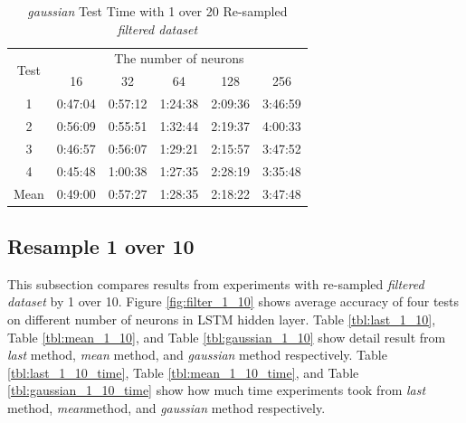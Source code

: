\documentclass[draft,dvipsnames]{drexel-thesis}
\begin{document}
\begin{thesis}
\begin{table}[!t]
\centering
\caption{{\em gaussian} Test Time with 1 over 20 Re-sampled {\em filtered dataset}}
\label{tbl:gaussian_1_20_time}
\begin{tabular}{|c|c|c|c|c|c|}
\hline
\multirow{2}{*}{Test}      & \multicolumn{5}{c|}{The number of neurons}                                                                                                               \\ \cline{2-6}
                           & 16                           & 32                           & 64                           & 128                          & 256                          \\ \hline
1                          & 0:47:04                      & 0:57:12                      & 1:24:38                      & 2:09:36                      & 3:46:59                      \\ \hline
2                          & 0:56:09                      & 0:55:51                      & 1:32:44                      & 2:19:37                      & 4:00:33                      \\ \hline
3                          & 0:46:57                      & 0:56:07                      & 1:29:21                      & 2:15:57                      & 3:47:52                      \\ \hline
4                          & 0:45:48                      & 1:00:38                      & 1:27:35                      & 2:28:19                      & 3:35:48                      \\ \hline
\multicolumn{1}{|l|}{Mean} & \multicolumn{1}{l|}{0:49:00} & \multicolumn{1}{l|}{0:57:27} & \multicolumn{1}{l|}{1:28:35} & \multicolumn{1}{l|}{2:18:22} & \multicolumn{1}{l|}{3:47:48} \\ \hline
\end{tabular}
\end{table}


\subsection{Resample 1 over 10}
This subsection compares results from experiments with re-sampled {\em filtered dataset} by 1 over 10. Figure \ref{fig:filter_1_10} shows average accuracy of four tests on different number of neurons in LSTM hidden layer. Table \ref{tbl:last_1_10}, Table \ref{tbl:mean_1_10}, and Table \ref{tbl:gaussian_1_10} show detail result from {\em last} method, {\em mean} method, and {\em gaussian} method respectively. Table \ref{tbl:last_1_10_time}, Table \ref{tbl:mean_1_10_time}, and Table \ref{tbl:gaussian_1_10_time} show how much time experiments took from {\em last} method, {\em mean}method, and {\em gaussian} method respectively.


\end{thesis}
\end{document}
